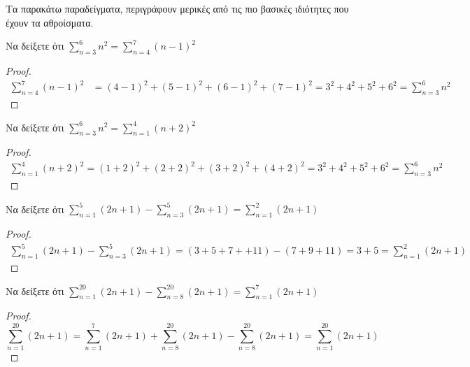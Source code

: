 \documentclass[main.tex]{subfiles}
\begin{document}
Τα παρακάτω παραδείγματα, περιγράφουν μερικές από τις πιο βασικές ιδιότητες που 
έχουν τα αθροίσματα.

\begin{example}
  Να δείξετε ότι $ \sum_{n=3}^{6} n^{2} = \sum_{n=4}^{7} (n-1)^{2}   $
\end{example}
\begin{proof}
  \begin{align*}
    \sum_{n=4}^{7} (n-1)^{2} &= (4-1)^{2}+(5-1)^{2}+(6-1)^{2}+(7-1)^{2} 
    = 3^{2}+4^{2}+5^{2}+6^{2} = \sum_{n=3}^{6} n^{2} 
  \end{align*}
\end{proof}

\begin{example}
  Να δείξετε ότι $ \sum_{n=3}^{6} n^{2} = \sum_{n=1}^{4} (n+2)^{2}   $
\end{example}
\begin{proof}
  \begin{align*}
    \sum_{n=1}^{4} (n+2)^{2} = (1+2)^{2}+(2+2)^{2}+(3+2)^{2}+(4+2)^{2}=
    3^{2}+4^{2}+5^{2}+6^{2} = \sum_{n=3}^{6} n^{2} 
  \end{align*}
\end{proof}

\begin{example}
  Να δείξετε ότι $ \sum_{n=1}^{5} (2n+1) - \sum_{n=3}^{5} (2n+1)  =  
  \sum_{n=1}^{2} (2n+1) $
\end{example}
\begin{proof}
  \begin{align*}
    \sum_{n=1}^{5} (2n+1)- \sum_{n=3}^{5} (2n+1) = 
    (3+5+7++11) - (7+9+11) = 3 + 5 = \sum_{n=1}^{2} (2n+1) 
  \end{align*}
\end{proof}

\begin{example}
  Να δείξετε ότι $ \sum_{n=1}^{20} (2n+1) - \sum_{n=8}^{20} (2n+1) = \sum_{n=1}^{7} 
  (2n+1) $ 
\end{example}
\begin{proof}
\item 
  \[
    \sum_{n=1}^{20} (2n+1) = \sum_{n=1}^{7} (2n+1) + 
    \sum_{n=8}^{20} (2n+1) - \sum_{n=8}^{20} (2n+1) = 
    \sum_{n=1}^{20} (2n+1)
  \]
\end{proof}
\end{document}
